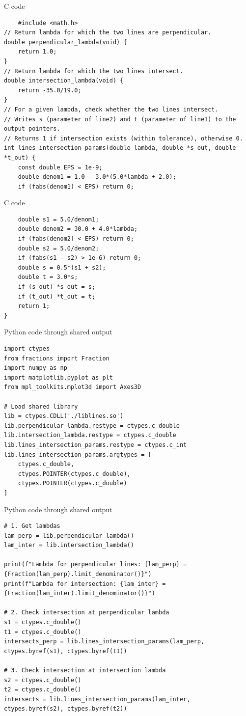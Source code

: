 \documentclass{beamer}
\begin{document}
\begin{frame}[fragile]{C code}
\begin{lstlisting}
    #include <math.h>
// Return lambda for which the two lines are perpendicular.
double perpendicular_lambda(void) {
    return 1.0;
}
// Return lambda for which the two lines intersect.
double intersection_lambda(void) {
    return -35.0/19.0;
}
// For a given lambda, check whether the two lines intersect.
// Writes s (parameter of line2) and t (parameter of line1) to the output pointers.
// Returns 1 if intersection exists (within tolerance), otherwise 0.
int lines_intersection_params(double lambda, double *s_out, double *t_out) {
    const double EPS = 1e-9;
    double denom1 = 1.0 - 3.0*(5.0*lambda + 2.0);
    if (fabs(denom1) < EPS) return 0;
     \end{lstlisting}
\end{frame}
    \begin{frame}[fragile]{C code}
\begin{lstlisting}
    double s1 = 5.0/denom1;
    double denom2 = 30.0 + 4.0*lambda;
    if (fabs(denom2) < EPS) return 0;
    double s2 = 5.0/denom2;
    if (fabs(s1 - s2) > 1e-6) return 0;
    double s = 0.5*(s1 + s2);
    double t = 3.0*s;
    if (s_out) *s_out = s;
    if (t_out) *t_out = t;
    return 1;
}
 \end{lstlisting}
\end{frame}
    \begin{frame}[fragile]{Python code through shared output}
\begin{lstlisting}
import ctypes
from fractions import Fraction
import numpy as np
import matplotlib.pyplot as plt
from mpl_toolkits.mplot3d import Axes3D

# Load shared library
lib = ctypes.CDLL('./liblines.so')
lib.perpendicular_lambda.restype = ctypes.c_double
lib.intersection_lambda.restype = ctypes.c_double
lib.lines_intersection_params.restype = ctypes.c_int
lib.lines_intersection_params.argtypes = [
    ctypes.c_double,
    ctypes.POINTER(ctypes.c_double),
    ctypes.POINTER(ctypes.c_double)
]
\end{lstlisting}
\end{frame}
  \begin{frame}[fragile]{Python code through shared output}
\begin{lstlisting}
# 1. Get lambdas
lam_perp = lib.perpendicular_lambda()
lam_inter = lib.intersection_lambda()

print(f"Lambda for perpendicular lines: {lam_perp} = {Fraction(lam_perp).limit_denominator()}")
print(f"Lambda for intersection: {lam_inter} = {Fraction(lam_inter).limit_denominator()}")

# 2. Check intersection at perpendicular lambda
s1 = ctypes.c_double()
t1 = ctypes.c_double()
intersects_perp = lib.lines_intersection_params(lam_perp, ctypes.byref(s1), ctypes.byref(t1))

# 3. Check intersection at intersection lambda
s2 = ctypes.c_double()
t2 = ctypes.c_double()
intersects = lib.lines_intersection_params(lam_inter, ctypes.byref(s2), ctypes.byref(t2))
\end{lstlisting}
\end{frame}
\end{document}

